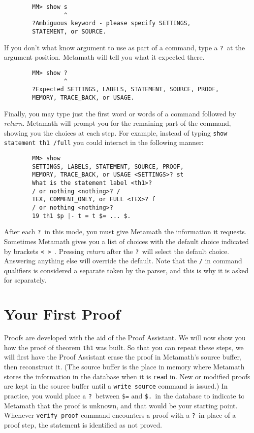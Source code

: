 \begin{verbatim}
        MM> show s
                 ^
        ?Ambiguous keyword - please specify SETTINGS,
        STATEMENT, or SOURCE.
\end{verbatim}

If you don't what know argument to use as part of a command, type a
\texttt{?}\index{\texttt{]}@\texttt{?}\ in command lines}\ at the
argument position.  Metamath will tell you what it expected there.

\begin{verbatim}
        MM> show ?
                 ^
        ?Expected SETTINGS, LABELS, STATEMENT, SOURCE, PROOF,
        MEMORY, TRACE_BACK, or USAGE.
\end{verbatim}

Finally, you may type just the first word or words of a command followed
by {\em return}.  Metamath will prompt you for the remaining part of the
command, showing you the choices at each step.  For example, instead of
typing \texttt{show statement th1 /full} you could interact in the
following manner:
\begin{verbatim}
        MM> show
        SETTINGS, LABELS, STATEMENT, SOURCE, PROOF,
        MEMORY, TRACE_BACK, or USAGE <SETTINGS>? st
        What is the statement label <th1>?
        / or nothing <nothing>? /
        TEX, COMMENT_ONLY, or FULL <TEX>? f
        / or nothing <nothing>?
        19 th1 $p |- t = t $= ... $.
\end{verbatim}
After each \texttt{?}\ in this mode, you must give Metamath the
information it requests.  Sometimes Metamath gives you a list of choices
with the default choice indicated by brackets \texttt{< > }. Pressing
{\em return} after the \texttt{?}\ will select the default choice.
Answering anything else will override the default.  Note that the
\texttt{/} in command qualifiers is considered a separate
token by the parser, and this is why it is asked for
separately.

\section{Your First Proof}\label{frstprf}

Proofs are developed with the aid of the Proof Assistant.  We will now show you how the proof of theorem \texttt{th1}
was built.  So that you can repeat these steps, we will first have the
Proof Assistant erase the proof in Metamath's source buffer, then reconstruct it.  (The source buffer is the place in memory
where Metamath stores the information in the database when it is
\texttt{read} in.  New or modified proofs
are kept in the source buffer until a \texttt{write source}
command is issued.)  In practice, you
would place a \texttt{?}\index{\texttt{]}@\texttt{?}\ inside proofs}\
between \texttt{\$=} and
\texttt{\$.}\ in the database to indicate
to Metamath\index{Metamath} that the proof is unknown, and that would be
your starting point.  Whenever \texttt{verify proof} command encounters
a proof with a \texttt{?}\ in place of a proof step, the statement is
identified as not proved.

